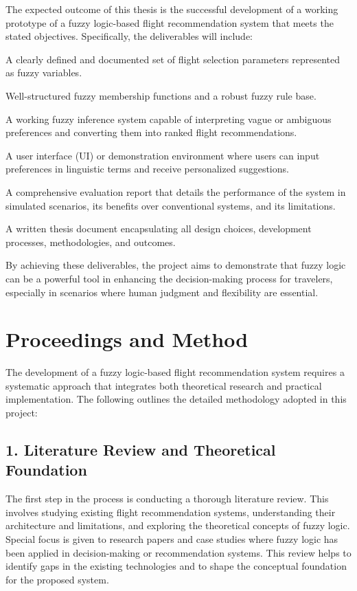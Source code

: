 \documentclass[a4paper]{article}
\begin{document}
The expected outcome of this thesis is the successful development of a working prototype of a fuzzy logic-based flight recommendation system that meets the stated objectives. Specifically, the deliverables will include:

A clearly defined and documented set of flight selection parameters represented as fuzzy variables.

Well-structured fuzzy membership functions and a robust fuzzy rule base.

A working fuzzy inference system capable of interpreting vague or ambiguous preferences and converting them into ranked flight recommendations.

A user interface (UI) or demonstration environment where users can input preferences in linguistic terms and receive personalized suggestions.

A comprehensive evaluation report that details the performance of the system in simulated scenarios, its benefits over conventional systems, and its limitations.

A written thesis document encapsulating all design choices, development processes, methodologies, and outcomes.

By achieving these deliverables, the project aims to demonstrate that fuzzy logic can be a powerful tool in enhancing the decision-making process for travelers, especially in scenarios where human judgment and flexibility are essential.

\section*{Proceedings and Method}

The development of a fuzzy logic-based flight recommendation system requires a systematic approach that integrates both theoretical research and practical implementation. The following outlines the detailed methodology adopted in this project:

\subsection*{1. Literature Review and Theoretical Foundation}

The first step in the process is conducting a thorough literature review. This involves studying existing flight recommendation systems, understanding their architecture and limitations, and exploring the theoretical concepts of fuzzy logic. Special focus is given to research papers and case studies where fuzzy logic has been applied in decision-making or recommendation systems. This review helps to identify gaps in the existing technologies and to shape the conceptual foundation for the proposed system.
\end{document}
